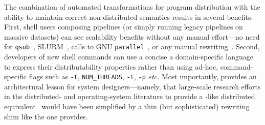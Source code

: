 \documentclass[sigplan,10pt,review,anonymous]{acmart}
\newcommand{\etc}{{\em etc.}\xspace}
\newcommand{\ttt}[1]{\texttt{\small #1}}
\begin{document}
The combination of automated transformations for program distribution with the ability to maintain correct non-distributed semantics results in several benefits.
First, shell users composing pipelines (or simply running legacy pipelines on massive datasets) can see scalability benefits without any manual effort---no need for \ttt{qsub}~\cite{gentzsch2001sun}, \textsc{SLURM}~\cite{yoo2003slurm}, calls to \textsc{GNU} \ttt{parallel}~\cite{Tange2011a}, or any manual rewriting~\cite{mapreduce:08, ciel:11, spark:12}.
Second, developers of new shell commands can use a concise a domain-specific language to express their distributability properties rather than using ad-hoc, command-specific flags such as {\tt -t},  {\tt NUM\_THREADS}, \ttt{-t}, \ttt{-p} \etc
Most importantly, \sys provides an architectural lesson for system designers---namely, that large-scale research efforts in the distributed- and operating-system literature to provide a \unix-like distributed equivalent~\cite{ousterhout1988sprite, mullender1990amoeba, pike1990plan9, barak1998mosix} would have been simplified by a thin (but sophisticated) rewriting shim like the one \sys provides.


% 
% 
% 
\end{document}
